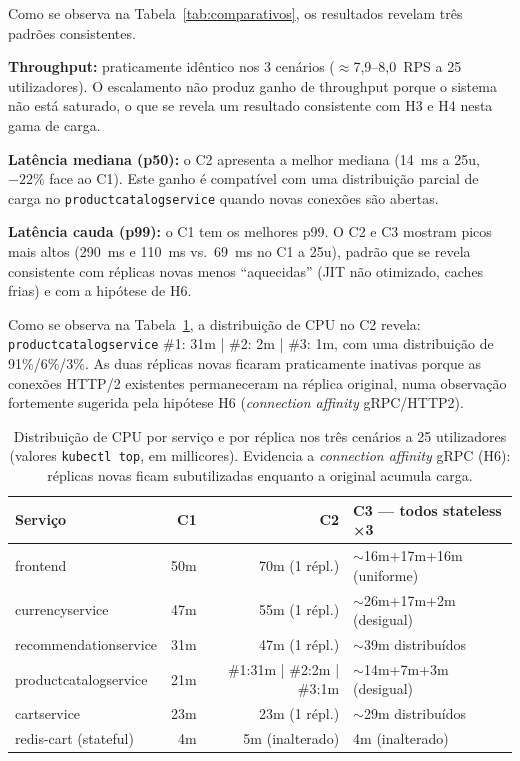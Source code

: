 \documentclass[manuscript,screen,review]{acmart}
\begin{document}
Como se observa na Tabela~\ref{tab:comparativos}, os resultados revelam três padrões consistentes.

\textbf{Throughput:} praticamente idêntico nos 3 cenários ($\approx$7,9--8,0~RPS a 25 utilizadores). O escalamento não produz ganho de throughput porque o sistema não está saturado, o que se revela um resultado consistente com H3 e H4 nesta gama de carga.

\textbf{Latência mediana (p50):} o C2 apresenta a melhor mediana (14~ms a 25u, $-22\%$ face ao C1). Este ganho é compatível com uma distribuição parcial de carga no \texttt{productcatalogservice} quando novas conexões são abertas.

\textbf{Latência cauda (p99):} o C1 tem os melhores p99. O C2 e C3 mostram picos mais altos (290~ms e 110~ms vs.\ 69~ms no C1 a 25u), padrão que se revela consistente com réplicas novas menos ``aquecidas'' (JIT não otimizado, caches frias) e com a hipótese de H6.

Como se observa na Tabela~\ref{tab:cpu}, a distribuição de CPU no C2 revela: \texttt{productcatalogservice} \#1: 31m | \#2: 2m | \#3: 1m, com uma distribuição de 91\%/6\%/3\%. As duas réplicas novas ficaram praticamente inativas porque as conexões HTTP/2 existentes permaneceram na réplica original, numa observação fortemente sugerida pela hipótese H6 (\textit{connection affinity} gRPC/HTTP2).

\begin{table}[t]
\caption{Distribuição de CPU por serviço e por réplica nos três cenários a 25 utilizadores (valores \texttt{kubectl top}, em millicores). Evidencia a \textit{connection affinity} gRPC (H6): réplicas novas ficam subutilizadas enquanto a original acumula carga.}
\label{tab:cpu}
\begin{tabularx}{\columnwidth}{lrrX}
\toprule
\textbf{Serviço} & \textbf{C1} & \textbf{C2} & \textbf{C3 — todos stateless ×3} \\
\midrule
frontend              & 50m & 70m (1 répl.)               & $\sim$16m+17m+16m (uniforme) \\
currencyservice       & 47m & 55m (1 répl.)               & $\sim$26m+17m+2m (desigual) \\
recommendationservice & 31m & 47m (1 répl.)               & $\sim$39m distribuídos \\
productcatalogservice & 21m & \#1:31m | \#2:2m | \#3:1m  & $\sim$14m+7m+3m (desigual) \\
cartservice           & 23m & 23m (1 répl.)               & $\sim$29m distribuídos \\
redis-cart (stateful) & 4m  & 5m (inalterado)             & 4m (inalterado) \\
\bottomrule
\end{tabularx}
\end{table}
\end{document}
